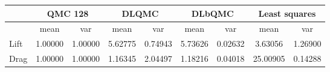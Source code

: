 \begin{tabular}{|l|c|c|c|c|c|c|c|c|}
\hline
 &\multicolumn{2}{c|}{\textbf{QMC 128}}&\multicolumn{2}{c|}{\textbf{DLQMC}}&\multicolumn{2}{c|}{\textbf{DLbQMC}}&\multicolumn{2}{c|}{\textbf{Least squares}}\\ 
\hline

 &mean&var&mean&var&mean&var&mean&var\\ 
\hline
Lift &1.00000&1.00000&5.62775&0.74943&5.73626&0.02632&3.63056&1.26900\\ 
\hline
Drag &1.00000&1.00000&1.16345&2.04497&1.18216&0.04018&25.00905&0.14288\\ 
\hline
\end{tabular}

